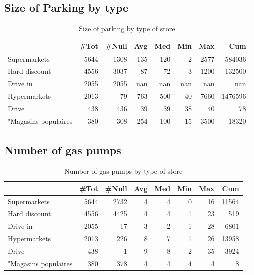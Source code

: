 \documentclass[11pt]{article}
\begin{document}
\subsection{Size of Parking by type}

\begin{table}[H]
\caption{Size of parking by type of store}
\small
\begin{tabular}{lrrrrrrr}
\toprule
{} &       \#Tot &  \#Null &        Avg &        Med &        Min &        Max &        Cum \\
\midrule
Supermarkets         &       5644 &   1308 &        135 &        120 &          2 &       2577 &     584036 \\
Hard discount        &       4556 &   3037 &         87 &         72 &          3 &       1200 &     132500 \\
Drive in             &       2055 &   2055 &        nan &        nan &        nan &        nan &        nan \\
Hypermarkets         &       2013 &     79 &        763 &        500 &         40 &       7660 &    1476596 \\
Drive                &        438 &    436 &         39 &         39 &         38 &         40 &         78 \\
"Magasins populaires &        380 &    308 &        254 &        100 &         15 &       3500 &      18320 \\
\bottomrule
\end{tabular}
\end{table}

\subsection{Number of gas pumps}

\begin{table}[H]
\caption{Number of gas pumps by type of store}
\small
\begin{tabular}{lrrrrrrr}
\toprule
{} &       \#Tot &  \#Null &        Avg &        Med &        Min &        Max &        Cum \\
\midrule
Supermarkets         &       5644 &   2732 &          4 &          4 &          0 &         16 &      11564 \\
Hard discount        &       4556 &   4425 &          4 &          4 &          1 &         23 &        519 \\
Drive in             &       2055 &     17 &          3 &          2 &          1 &         28 &       6801 \\
Hypermarkets         &       2013 &    226 &          8 &          7 &          1 &         26 &      13958 \\
Drive                &        438 &      1 &          9 &          8 &          2 &         35 &       3924 \\
"Magasins populaires &        380 &    378 &          4 &          4 &          4 &          4 &          8 \\
\bottomrule
\end{tabular}
\end{table}
\end{document}
